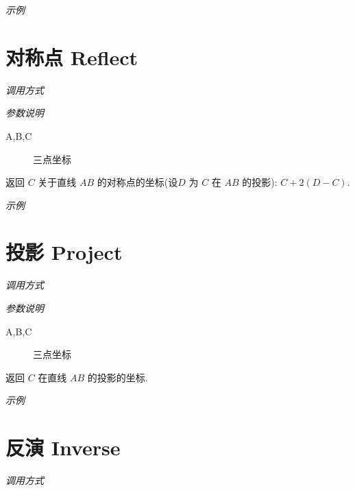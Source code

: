 \emph{示例}


\section{对称点 Reflect}

\emph{调用方式}

\begin{tcolorbox}{}
\end{tcolorbox}

\emph{参数说明}

\begin{description}
  \item[A,B,C] 三点坐标
\end{description}

返回 $C$ 关于直线 $AB$ 的对称点的坐标(设$D$ 为 $C$ 在 $AB$ 的投影): $C+2(D-C)$.

\emph{示例}


\section{投影 Project}

\emph{调用方式}

\begin{tcolorbox}{}
\end{tcolorbox}

\emph{参数说明}

\begin{description}
  \item[A,B,C] 三点坐标
\end{description}

返回 $C$ 在直线 $AB$ 的投影的坐标.

\emph{示例}


\section{反演 Inverse}

\emph{调用方式}

\begin{tcolorbox}{}
\end{tcolorbox}

